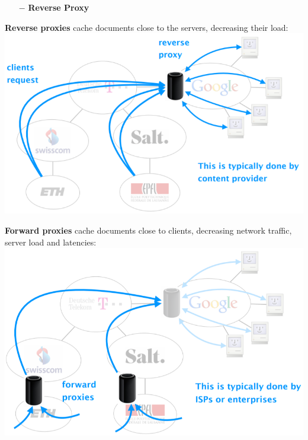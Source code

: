\documentclass[a4paper, fontsize=8pt, landscape, DIV=1]{scrartcl}
\begin{document}
\begin{multicols*}{4}
\begin{itemize}[noitemsep]
			\begin{itemize}
				\item[$-$] \textbf{Reverse Proxy}
			\end{itemize}
		\end{itemize}
		\textbf{Reverse proxies} cache documents close to the servers, decreasing their load:\\
		\includegraphics[width=\columnwidth]{images/Application_Layer/reverse_proxy.png}
		\par
		
		\textbf{Forward proxies} cache documents close to clients, decreasing network traffic, server load and latencies:\\
		\includegraphics[width=\columnwidth]{images/Application_Layer/forward_proxy.png}
		\par 
		

\end{multicols*}
\end{document}

